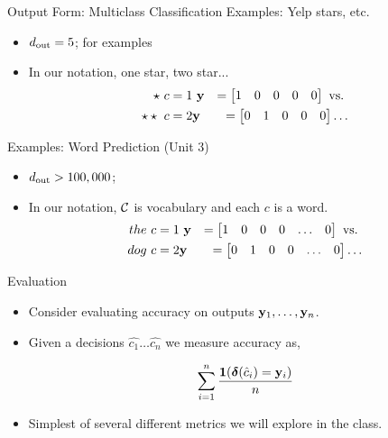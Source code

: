 \documentclass{beamer}
\begin{document}
\begin{frame}{Output Form: Multiclass Classification}
  Examples: Yelp stars, etc.
  \begin{itemize}
  \item ${d_{\mathrm{out}}} = 5$; for examples
  \item In our notation, one star, two star...
    \begin{eqnarray*} 
      \star \ c = 1 & \  \mathbf{y} &= \begin{bmatrix} 1 & 0 & 0 & 0 & 0  \end{bmatrix}  \mathrm {\ vs. \ } \\
    \star \star \ c = 2 & \mathbf{y} &=    \begin{bmatrix} 0 & 1 & 0 & 0 & 0 \end{bmatrix} \ldots
   \end{eqnarray*} 
  \end{itemize}
  Examples: Word Prediction (Unit 3)
  \begin{itemize}
  \item ${d_{\mathrm{out}}} > 100,000$; 
  \item In our notation, $\mathcal{C}$ is vocabulary and each $c$ is a word.   
    \begin{eqnarray*} 
      the \ c = 1 & \  \mathbf{y} &= \begin{bmatrix} 1 & 0 & 0 & 0 & \ldots & 0  \end{bmatrix}  \mathrm {\ vs. \ } \\
      dog \ c = 2 & \mathbf{y} &=    \begin{bmatrix} 0 & 1 & 0 & 0 & \ldots & 0 \end{bmatrix} \ldots
   \end{eqnarray*} 
  \end{itemize}
\end{frame}

\begin{frame}{Evaluation}
  \begin{itemize}
  \item Consider evaluating accuracy on outputs $\mathbf{y}_1, \ldots, \mathbf{y}_n$. 

  \item Given a decisions $\hat{c_1} \ldots \hat{c_n}$ we measure 
  accuracy as,
  
  \[ \sum_{i=1}^n \frac{\mathbf{1}(\boldsymbol{\delta}(\hat{c}_i) = \mathbf{y}_i)}{ n} \] 

  \item Simplest of  several different metrics we will explore in the class. 
  \end{itemize}
\end{frame}
\end{document}
